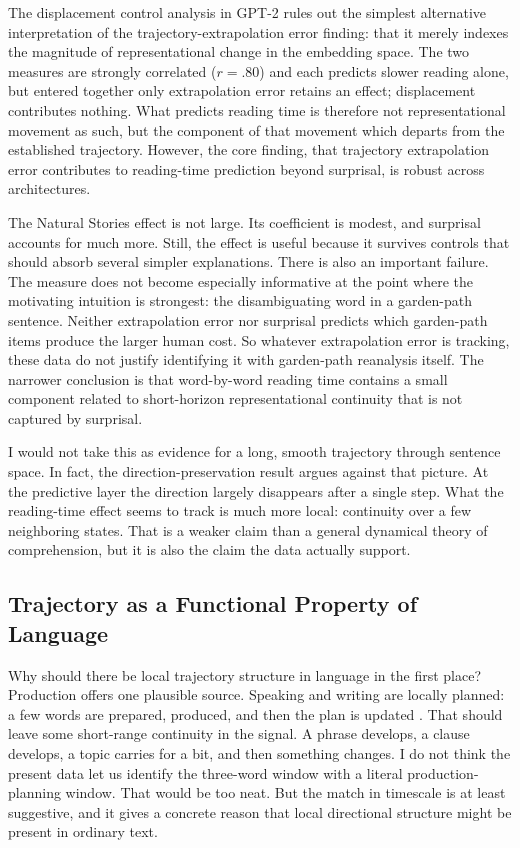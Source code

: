 \documentclass[12pt]{article}
\newcommand{\new}[1]{#1}   %
\begin{document}
The displacement control analysis in GPT-2 rules out the simplest alternative interpretation of the trajectory-extrapolation error finding: that it merely indexes the magnitude of representational change in the embedding space. \new{The two measures are strongly correlated ($r = .80$) and each predicts slower reading alone, but entered together only extrapolation error retains an effect; displacement contributes nothing. What predicts reading time is therefore not representational movement as such, but the component of that movement which departs from the established trajectory.} However, the core finding, that trajectory extrapolation error contributes to reading-time prediction beyond surprisal, is robust across architectures.

The Natural Stories effect is not large. Its coefficient is modest, and surprisal accounts for much more. Still, the effect is useful because it survives controls that should absorb several simpler explanations. \new{There is also an important failure. The measure does not become especially informative at the point where the motivating intuition is strongest: the disambiguating word in a garden-path sentence. Neither extrapolation error nor surprisal predicts which garden-path items produce the larger human cost. So whatever extrapolation error is tracking, these data do not justify identifying it with garden-path reanalysis itself.} The narrower conclusion is that word-by-word reading time contains a small component related to short-horizon representational continuity that is not captured by surprisal.

I would not take this as evidence for a long, smooth trajectory through sentence space. In fact, the direction-preservation result argues against that picture. At the predictive layer the direction largely disappears after a single step. What the reading-time effect seems to track is much more local: continuity over a few neighboring states. That is a weaker claim than a general dynamical theory of comprehension, but it is also the claim the data actually support.

\subsection{Trajectory as a Functional Property of Language}

Why should there be local trajectory structure in language in the first place? Production offers one plausible source. Speaking and writing are locally planned: a few words are prepared, produced, and then the plan is updated \citep{levelt1989,ferreira2002}. That should leave some short-range continuity in the signal. A phrase develops, a clause develops, a topic carries for a bit, and then something changes. I do not think the present data let us identify the three-word window with a literal production-planning window. That would be too neat. But the match in timescale is at least suggestive, and it gives a concrete reason that local directional structure might be present in ordinary text.
\end{document}
